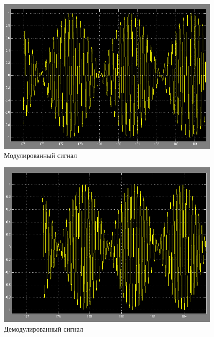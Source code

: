 
\begin{figure}[H]
   \includegraphics[scale=0.5]{lab7/Scope.png}
   \caption{Модулированный сигнал}
\end{figure}
\begin{figure}[H]
   \includegraphics[scale=0.5]{lab7/Scope3.png}
   \caption{Демодулированный сигнал}
\end{figure}



